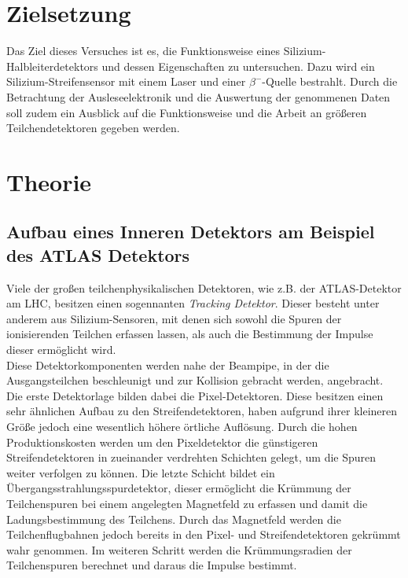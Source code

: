 \section{Zielsetzung}
\label{sec:Zielsetzung}

Das Ziel dieses Versuches ist es, die Funktionsweise eines Silizium-Halbleiterdetektors und dessen Eigenschaften zu untersuchen. Dazu wird ein Silizium-Streifensensor mit einem Laser und einer $\beta^{-}$-Quelle bestrahlt. Durch die Betrachtung der Ausleseelektronik und die Auswertung der genommenen Daten soll zudem ein Ausblick auf die Funktionsweise und die Arbeit an größeren Teilchendetektoren gegeben werden.

\section{Theorie}
\label{sec:Theorie}
\subsection{Aufbau eines Inneren Detektors am Beispiel des ATLAS Detektors}

Viele der großen teilchenphysikalischen Detektoren, wie z.B. der ATLAS-Detektor am LHC, besitzen einen sogennanten \textit{Tracking Detektor}. Dieser besteht unter anderem aus Silizium-Sensoren, mit denen sich sowohl die Spuren der ionisierenden Teilchen erfassen lassen, als auch die Bestimmung der Impulse dieser ermöglicht wird.\\
Diese Detektorkomponenten werden nahe der Beampipe, in der die Ausgangsteilchen beschleunigt und zur Kollision gebracht werden, angebracht. Die erste Detektorlage bilden dabei die Pixel-Detektoren. Diese besitzen einen sehr ähnlichen Aufbau zu den Streifendetektoren, haben aufgrund ihrer kleineren Größe jedoch eine wesentlich höhere örtliche Auflösung. Durch die hohen Produktionskosten werden um den Pixeldetektor die günstigeren Streifendetektoren in zueinander verdrehten Schichten gelegt, um die Spuren weiter verfolgen zu können. Die letzte Schicht bildet ein Übergangsstrahlungsspurdetektor, dieser ermöglicht die Krümmung der Teilchenspuren bei einem angelegten Magnetfeld zu erfassen und damit die Ladungsbestimmung des Teilchens. Durch das Magnetfeld werden die Teilchenflugbahnen jedoch bereits in den Pixel- und Streifendetektoren gekrümmt wahr genommen. Im weiteren Schritt werden die Krümmungsradien der Teilchenspuren berechnet und daraus die Impulse bestimmt.

